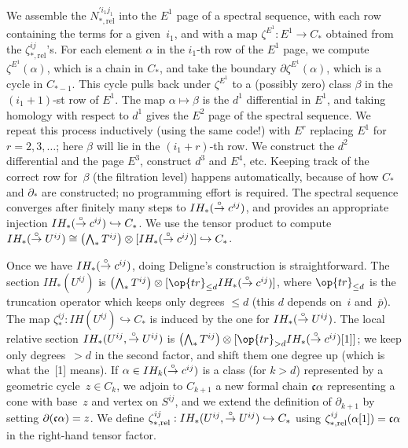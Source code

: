 We assemble the $N^{\prime i_1 j_1}_{*,\text{rel}}$ into the $E^1$
page of a spectral sequence, with each row containing the terms for a
given~$i_1$, and with a map $\zeta^{E^1} : E^1 \to C_*$ obtained
from the $\zeta^{ij}_{*, \text{rel}}$'s.  For each element $\alpha$ in
the $i_1$-th row of the
$E^1$ page, we compute $\zeta^{E^1}(\alpha)$, which is a chain in
$C_*$, and take the boundary $\partial \zeta^{E^1}(\alpha)$, which is
a cycle in $C_{*-1}$.  This cycle pulls back under $\zeta^{E^1}$ to a
(possibly zero) class $\beta$ in the $(i_1+1)$-st row of $E^1$.  The
map $\alpha \mapsto \beta$ is the $d^1$ differential in $E^1$, and
taking homology with respect to $d^1$ gives the $E^2$ page of the
spectral sequence.  We repeat this process inductively (using the same
code!) with $E^r$ replacing $E^1$ for $r=2, 3, \dots$; here $\beta$
will lie in the $(i_1+r)$-th row.  We construct the $d^2$ differential
and the page $E^3$, construct $d^3$ and $E^4$, etc.  Keeping track of
the correct row for~$\beta$ (the filtration level) happens
automatically, because of how $C_*$ and $\partial_*$ are constructed;
no programming effort is required.  The spectral sequence converges
after finitely many steps to $IH_*(\overset\circ\to c^{ij})$, and provides an
appropriate injection $IH_*(\overset\circ\to c^{ij}) \hookrightarrow C_*$.  We use
the tensor product to compute $IH_*(\overset\circ\to U^{ij}) \cong \left(
\bigwedge\nolimits_* T^{ij}\right) \otimes [IH_*(\overset\circ\to c^{ij})]
\hookrightarrow C_*$.

Once we have $IH_*(\overset\circ\to c^{ij})$, doing Deligne's construction is
straightforward.  The section $IH_*(U^{ij})$ is
$\left(\bigwedge\nolimits_* T^{ij} \right) \otimes [\op{tr}_{\le d}
IH_*(\oc^{ij})]$, where $\op{tr}_{\le d}$ is the truncation operator
which keeps only degrees $\le d$ (this $d$ depends on~$i$ and~$\bar
p$).  The map $\zeta_*^{ij} : IH(U^{ij}) \hookrightarrow C_*$ is
induced by the one for $IH_*(\overset\circ\to U^{ij})$.  The local relative section
$IH_*(U^{ij}, \overset\circ\to U^{ij})$ is $\left( \bigwedge\nolimits_* T^{ij}
\right) \otimes [\op{tr}_{> d} IH_*(\oc^{ij})[1]]$; we keep only
degrees~$>d$ in the second factor, and shift them one degree up (which
is what the~[1] means).  If $\alpha \in IH_k(\overset\circ\to c^{ij})$ is a class (for
$k>d$) represented by a geometric cycle~$z \in C_k$, we adjoin to
$C_{k+1}$ a new formal chain $\frak c \alpha$ representing a cone with
base~$z$ and vertex on $S^{ij}$, and we extend the definition of $
\partial_{k+1}$ by setting $
\partial(\frak c \alpha) = z$.  We define
$\zeta_{*,\text{rel}}^{ij} : IH_*(U^{ij}, \overset\circ\to U^{ij}) \hookrightarrow
C_*$ using $\zeta_{*,\text{rel}}^{ij}(\alpha[1]) = \frak c \alpha$ in
the right-hand tensor factor.

